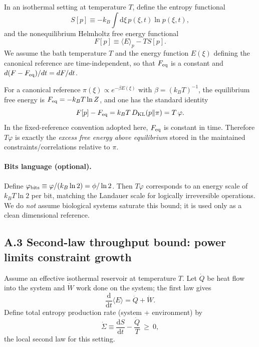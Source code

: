 \documentclass[10pt]{article}
\providecommand{\dd}{\mathrm{d}}
\begin{document}
In an isothermal setting at temperature $T$, define the entropy functional
\begin{equation}
S[p]\equiv -k_B\int \dd \xi\, p(\xi,t)\ln p(\xi,t),
\label{eq:app_entropy}
\end{equation}
and the nonequilibrium Helmholtz free energy functional
\begin{equation}
F[p]\equiv \langle E\rangle_p - T S[p].
\label{eq:app_F_def}
\end{equation}
We assume the bath temperature $T$ and the energy function $E(\xi)$ defining the canonical reference are time-independent,
so that $F_{\rm eq}$ is a constant and $d(F-F_{\rm eq})/dt = dF/dt$.

For a canonical reference $\pi(\xi)\propto e^{-\beta E(\xi)}$ with $\beta=(k_BT)^{-1}$, the equilibrium
free energy is $F_{\rm eq}=-k_BT\ln Z$, and one has the standard identity
\begin{equation}
F[p]-F_{\rm eq} = k_B T\,D_{\mathrm{KL}}(p\Vert\pi)=T\,\varphi.
\label{eq:app_F_minus_Feq}
\end{equation}
In the fixed-reference convention adopted here, $F_{\rm eq}$ is constant in time.
Therefore $T\varphi$ is exactly the \emph{excess free energy above equilibrium} stored in the
maintained constraints/correlations relative to $\pi$.

\paragraph{Bits language (optional).}
Define $\varphi_{\rm bits}\equiv \varphi/(k_B\ln2)=\phi/\ln2$. Then $T\varphi$ corresponds to an
energy scale of $k_BT\ln2$ per bit, matching the Landauer scale for logically irreversible
operations. We do \emph{not} assume biological systems saturate this bound; it is used only as a
clean dimensional reference.

\subsection{A.3 Second-law throughput bound: power limits constraint growth}
\label{app:second_law_bound}

Assume an effective isothermal reservoir at temperature $T$.
Let $\dot Q$ be heat flow into the system and $\dot W$ work done on the system; the first law gives
\begin{equation}
\frac{\dd}{\dd t}\langle E\rangle = \dot Q + \dot W.
\label{eq:app_firstlaw}
\end{equation}
Define total entropy production rate (system + environment) by
\begin{equation}
\dot\Sigma \equiv \frac{\dd S}{\dd t}-\frac{\dot Q}{T}\ \ge\ 0,
\label{eq:app_sigmadot}
\end{equation}
the local second law for this setting.
\end{document}
